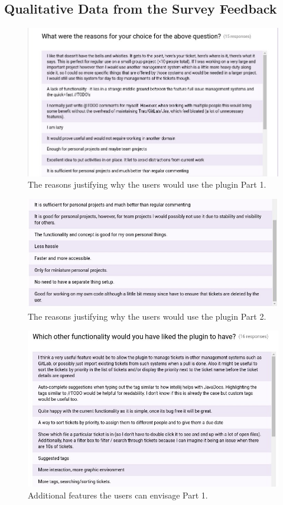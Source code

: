 \documentclass{4thYearProject}
\begin{document}
\begin{appendices}
\chapter{Qualitative Data from the Survey Feedback}

\begin{figure}
\includegraphics[scale=0.5]{Reasons_for_choosing}
\centering
\caption{The reasons justifying why the users would use the plugin Part 1.}
\label{fig:reason1}
\end{figure}

\begin{figure}
\includegraphics[scale=0.5]{Reasons_for_choosing2}
\centering
\caption{The reasons justifying why the users would use the plugin Part 2.}
\label{fig:reason2}
\end{figure}

\begin{figure}
\includegraphics[scale=0.5]{Other_function}
\centering
\caption{Additional features the users can envisage Part 1.}
\label{fig:func1}
\end{figure}


\end{appendices}
\end{document}
